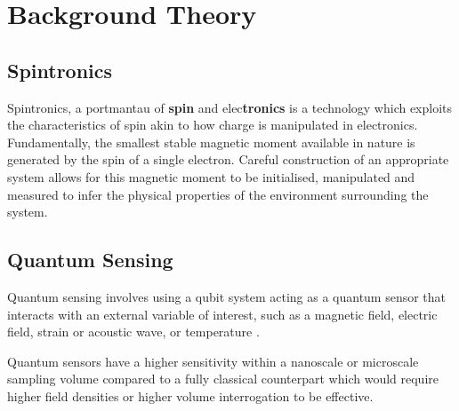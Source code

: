 \chapter{Background Theory}

\section{Spintronics}
Spintronics, a portmantau of \textbf{spin} and elec\textbf{tronics} is a technology which exploits the characteristics of spin akin to how charge is manipulated in electronics. Fundamentally, the smallest stable magnetic moment available in nature is generated by the spin of a single electron. Careful construction of an appropriate system allows for this magnetic moment to be initialised, manipulated and measured to infer the physical properties of the environment surrounding the system. 


\section{Quantum Sensing}
Quantum sensing involves using a qubit system acting as a quantum sensor that interacts with an external variable of
interest, such as a magnetic field, electric field, strain or acoustic wave, or temperature \cite{Castelletto_2024}. 

Quantum sensors have a higher sensitivity within a nanoscale or microscale sampling volume compared to a fully classical counterpart which would require higher field densities or higher volume interrogation to be effective. 

\cite{Wolfowicz2021}

\cite{Kin2021}


\cite{Cochrane2016}


